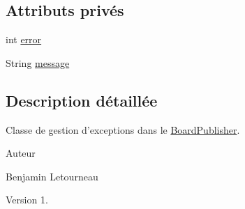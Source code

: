 \subsection*{Attributs privés}
\begin{DoxyCompactItemize}
\item 
int \hyperlink{classcom_1_1publisher_1_1utils_1_1BPHandlerException_a22187f6ed53004154eead03978409a11}{error}
\item 
String \hyperlink{classcom_1_1publisher_1_1utils_1_1BPHandlerException_ad64b758d099e991b5b86d489b56e582b}{message}
\end{DoxyCompactItemize}


\subsection{Description détaillée}
Classe de gestion d'exceptions dans le \hyperlink{interfacecom_1_1publisher_1_1BoardPublisher}{Board\-Publisher}. \begin{DoxyAuthor}{Auteur}

\begin{DoxyItemize}
\item Benjamin Letourneau 
\end{DoxyItemize}
\end{DoxyAuthor}
\begin{DoxyVersion}{Version}
1. 
\end{DoxyVersion}


